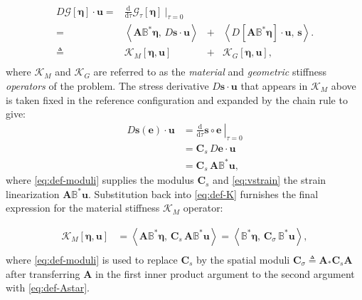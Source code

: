\begin{equation}
\begin{array}{rccc}
D\mathcal{G}[\bm{\eta}]\cdot \bm{u}
=& \frac{\mathrm{d}}{\mathrm{d}\tau} \mathcal{G}_\tau [\bm{\eta}] ~\biggr|_{\tau=0} \\[0.3cm]
  =&  \left< \bm{A}\mathbb{B}^*_{} \bm{\eta} , \, D\bm{s}\cdot \bm{u}\right> &+& \left< D_{}[ \bm{A} \mathbb{B}^*_{}\bm{\eta}]\cdot \bm{u}, \, \bm{s}\right>. \\[0.3cm]
  \triangleq& \mathcal{K}_{M}\left[\bm{\eta}, \bm{u}\right] &+& \mathcal{K}_{G}\left[\bm{\eta}, \bm{u}\right], \\
\end{array}
\label{eq:def-K}
\end{equation} 
where \(\mathcal{K}_{M}\) and \(\mathcal{K}_{G}\) are referred to as the \emph{material} and \emph{geometric} stiffness \emph{operators} of the problem. 
The stress derivative \(D\bm{s}\cdot \bm{u} \) that appears 
in \(\mathcal{K}_{M}\) above 
is taken fixed in the reference configuration
and expanded by the chain rule to give:
\begin{equation}
\begin{aligned}
D\bm{s}(\bm{e}) \cdot \bm{u} &= \left.\frac{\mathrm{d}}{\mathrm{d} \tau} \left. \bm{s}\circ \bm{e} \right. ~\right|_{\tau=0} \\
&= \bm{C}_s \, D \bm{e} \cdot \bm{u} \\
&= \bm{C}_s \, \bm{A}\mathbb{B}^*_{} \bm{u},
\end{aligned}
\end{equation}
where \eqref{eq:def-moduli}
supplies %
the modulus \(\bm{C}_s\) and
\eqref{eq:vstrain} the strain linearization
\(\bm{A}\mathbb{B}^*_{} \bm{u}\).
Substitution back into \eqref{eq:def-K} furnishes the final expression for the material stiffness
\(\mathcal{K}_M\) operator:

\begin{equation}
\begin{aligned}
\mathcal{K}_{M}\left[\bm{\eta}, \bm{u} \right]
&= \left< \bm{A}\mathbb{B}^*_{} \bm{\eta} , \, \bm{C}_s \, \bm{A}\mathbb{B}^*_{} \bm{u}\right> %
= \left<\mathbb{B}^*_{} \bm{\eta} , \, \bm{C}_\sigma \, \mathbb{B}^*_{} \bm{u}\right>, \\
\end{aligned}
\label{eq:Km}
\end{equation}
where \eqref{eq:def-moduli} is used to replace \(\bm{C}_s\) by the spatial moduli \(\bm{C}_{\sigma}\triangleq \bm{A}_*\bm{C}_s\bm{A}\)
after transferring \(\bm{A}\) in the first inner product argument to the second argument
with \eqref{eq:def-Astar}.

